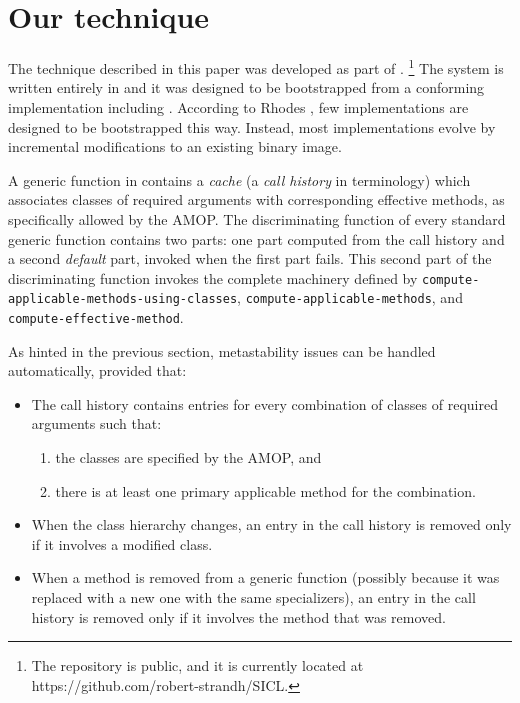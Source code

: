 \section{Our technique}

The technique described in this paper was developed as part of
\sicl{}.%
\footnote{The \sicl{} repository is public, and it is currently
  located at https://github.com/robert-strandh/SICL.}  The system is
written entirely in \cl{} and it was designed to be bootstrapped 
from a conforming \cl{} implementation including \clos{}.  
According to Rhodes \cite{Rhodes:2008:SSC:1482373.1482380}, few \cl{}
implementations are designed to be bootstrapped this way.  Instead,
most implementations evolve by incremental modifications to an
existing binary image.

A generic function in \sicl{} contains a \emph{cache} (a \emph{call
  history} in \sicl{} terminology) which associates classes of
required arguments with corresponding effective methods, as
specifically allowed by the AMOP.  The discriminating function of
every standard generic function contains two parts: one part computed
from the call history and a second \emph{default} part, invoked when
the first part fails.  This second part of the discriminating function
invokes the complete machinery defined by
\texttt{compute-applicable-methods-using-classes},
\texttt{compute-applicable-methods}, and
\texttt{compute-effective-method}.

As hinted in the previous section, metastability issues can be handled
automatically, provided that:

\begin{itemize}
\item The call history contains entries for every combination of
  classes of required arguments such that:
  \begin{enumerate}
  \item the classes are specified by the AMOP, and 
  \item there is at least one primary applicable method for the
    combination.
  \end{enumerate}
\item When the class hierarchy changes, an entry in the call history
  is removed only if it involves a modified class.
\item When a method is removed from a generic function (possibly
  because it was replaced with a new one with the same specializers),
  an entry in the call history is removed only if it involves the
  method that was removed.
\end{itemize}

